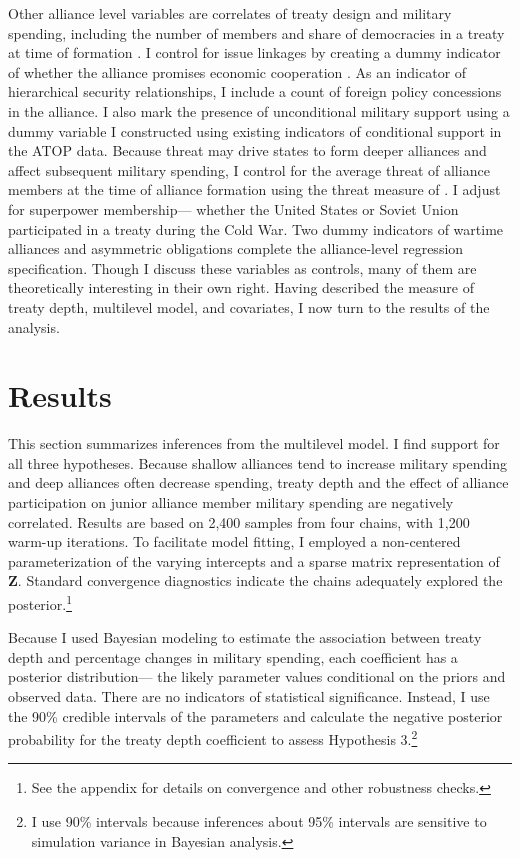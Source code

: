 \documentclass[12pt]{article}
\begin{document}
 
Other alliance level variables are correlates of treaty design and military spending, including the number of members and share of democracies in a treaty at time of formation \citep{Chibaetal2015}. 
I control for issue linkages by creating a dummy indicator of whether the alliance promises economic cooperation \citep{Poast2013, LongLeeds2006}. 
As an indicator of hierarchical security relationships, I include a count of foreign policy concessions in the alliance. 
I also mark the presence of unconditional military support using a dummy variable I constructed using existing indicators of conditional support in the ATOP data. 
Because threat may drive states to form deeper alliances and affect subsequent military spending, I control for the average threat of alliance members at the time of alliance formation using the threat measure of \citet{LeedsSavun2007}. 
I adjust for superpower membership--- whether the United States or Soviet Union participated in a treaty during the Cold War. 
Two dummy indicators of wartime alliances and asymmetric obligations \citep{Leedsetal2002} complete the alliance-level regression specification. 
Though I discuss these variables as controls, many of them are theoretically interesting in their own right. 
Having described the measure of treaty depth, multilevel model, and covariates, I now turn to the results of the analysis. 

 

\section{Results}


This section summarizes inferences from the multilevel model. 
I find support for all three hypotheses. 
Because shallow alliances tend to increase military spending and deep alliances often decrease spending, treaty depth and the effect of alliance participation on junior alliance member military spending are negatively correlated. 
Results are based on 2,400 samples from four chains, with 1,200 warm-up iterations. 
To facilitate model fitting, I employed a non-centered parameterization of the varying intercepts and a sparse matrix representation of \textbf{Z}. 
Standard convergence diagnostics indicate the chains adequately explored the posterior.\footnote{See the appendix for details on convergence and other robustness checks.} 


Because I used Bayesian modeling to estimate the association between treaty depth and percentage changes in military spending, each coefficient has a posterior distribution--- the likely parameter values conditional on the priors and observed data.
There are no indicators of statistical significance. 
Instead, I use the 90\% credible intervals of the parameters and calculate the negative posterior probability for the treaty depth coefficient to assess Hypothesis 3.\footnote{I use 90\% intervals because inferences about 95\% intervals are sensitive to simulation variance in Bayesian analysis.}
\end{document}
